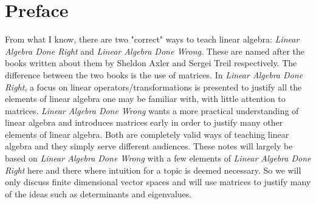 \chapter{Preface}

From what I know, there are two "correct" ways to teach linear algebra: \textit{Linear Algebra Done Right} and \textit{Linear Algebra Done Wrong}. These are named after the books written about them by Sheldon Axler and Sergei Treil respectively. The difference between the two books is the use of matrices. In \textit{Linear Algebra Done Right}, a focus on linear operators/transformations is presented to justify all the elements of linear algebra one may be familiar with, with little attention to matrices. \textit{Linear Algebra Done Wrong} wants a more practical understanding of linear algebra and introduces matrices early in order to justify many other elements of linear algebra. Both are completely valid ways of teaching linear algebra and they simply serve different audiences. These notes will largely be based on \textit{Linear Algebra Done Wrong} with a few elements of \textit{Linear Algebra Done Right} here and there where intuition for a topic is deemed necessary. So we will only discuss finite dimensional vector spaces and will use matrices to justify many of the ideas such as determinants and eigenvalues.